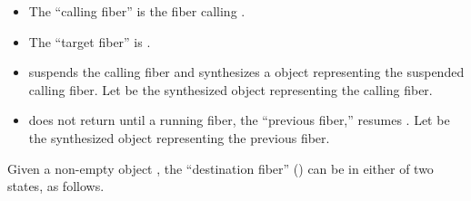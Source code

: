 \begin{itemize}
    \item The ``calling fiber'' is the fiber calling \resumewith.
    \item The ``target fiber'' is \thefiber{\state}.
    \item \resumewith suspends the calling fiber and synthesizes
          a \fiber object representing the suspended calling fiber. Let
           be the synthesized \fiber object representing the
          calling fiber.
    \item \resumewith does not return until a running fiber, the
          ``previous fiber,'' resumes .
          Let  be the synthesized \fiber object representing the
          previous fiber.
\end{itemize}

Given a non-empty \fiber object , the ``destination fiber''
() can be in either of two states, as follows.


